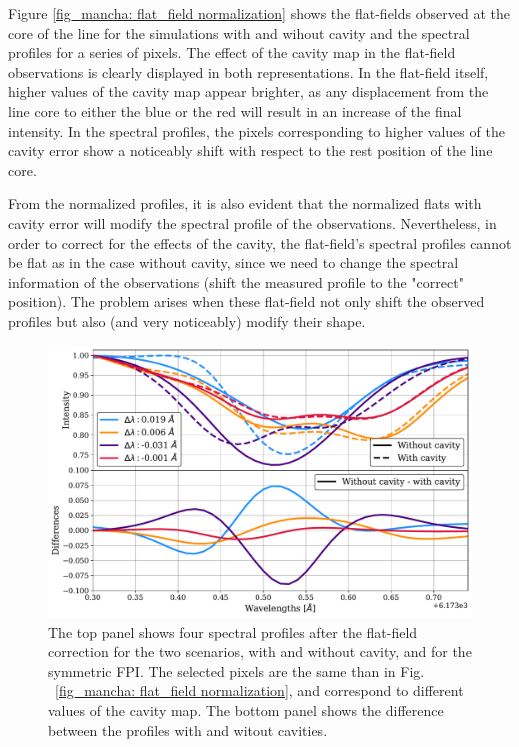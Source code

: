 Figure \ref{fig_mancha: flat_field normalization} shows the flat-fields observed at the core of the line for the simulations with and wihout cavity and the spectral profiles for a series of pixels. The effect of the cavity map in the flat-field observations is clearly displayed in both representations. In the flat-field itself, higher values of the cavity map appear brighter, as any displacement from the line core to either the blue or the red will result in an increase of the final intensity. In the spectral profiles, the pixels corresponding to higher values of the cavity error show a noticeably shift with respect to the rest position of the line core.   

From the normalized profiles, it is also evident that the normalized flats with cavity error will modify the spectral profile of the observations. Nevertheless, in order to correct for the effects of the cavity, the flat-field's spectral profiles cannot be flat as in the case without cavity, since we need to change the spectral information of the observations (shift the measured profile to the "correct" position). The problem arises when these flat-field not only shift the observed profiles but also (and very noticeably) modify their shape. 

\begin{figure}
  \begin{minipage}[c]{0.7\textwidth}
    \includegraphics[width=\textwidth]{figures/Mancha/flatfield_norm_differences.pdf}
  \end{minipage}\hfill\hfill
  \begin{minipage}[c]{0.27\textwidth}
    \caption{
          The top panel shows four spectral profiles after the flat-field correction for the two scenarios, with and without cavity, and for the symmetric FPI. The selected pixels are the same than in Fig. ~\ref{fig_mancha: flat_field normalization}, and correspond to different values of the cavity map. The bottom panel shows the difference between the profiles with and witout cavities.
    \label{fig_mancha: Profiles_differences}} 
  \end{minipage}
\end{figure}

